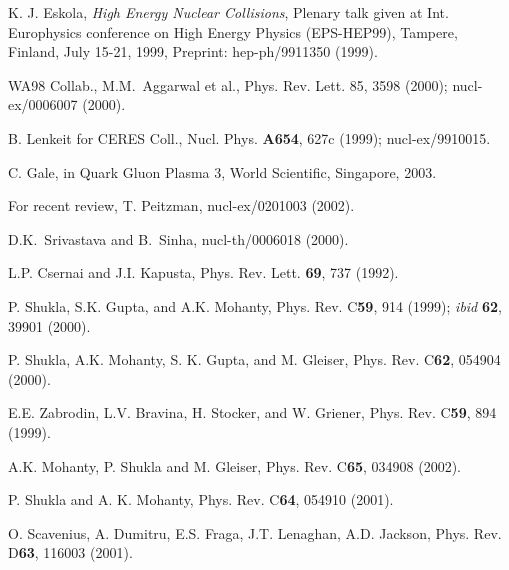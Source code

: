 \newpage

\begin{figure}
\centerline{}
\caption{}
\label{photon}
\end{figure}

\begin{figure}
\centerline{}
\caption{}
\label{photon}
\end{figure}


\begin{thebibliography}{00}

 K. J. Eskola, {\it High Energy Nuclear Collisions}, 
  Plenary talk given at Int. Europhysics conference on High Energy Physics 
  (EPS-HEP99), Tampere, Finland, July 15-21, 1999, 
  Preprint: hep-ph/9911350 (1999).
  
 WA98 Collab., M.M.\ Aggarwal et al., 
            Phys. Rev. Lett. 85, 3598 (2000); nucl-ex/0006007 (2000).

 B. Lenkeit for CERES Coll., 
        Nucl. Phys. {\bf A654}, 627c (1999); nucl-ex/9910015.  
  
 C. Gale, in {Quark Gluon Plasma 3}, World Scientific,
         Singapore, 2003. 
         
 For recent review,  T. Peitzman, nucl-ex/0201003 (2002).

 D.K.\ Srivastava and B.\ Sinha, nucl-th/0006018 (2000).

 L.P. Csernai and J.I. Kapusta, Phys. Rev. Lett. {\bf 69},
               737 (1992).

 P. Shukla, S.K. Gupta, and A.K. Mohanty,
         Phys. Rev. C{\bf 59}, 914 (1999); {\it ibid} {\bf 62}, 39901 (2000).

 P. Shukla, A.K. Mohanty, S. K. Gupta, and M. Gleiser,
              Phys. Rev. C{\bf 62}, 054904 (2000).

 E.E. Zabrodin, L.V. Bravina, H. Stocker, and W. Griener,
         Phys. Rev. C{\bf 59}, 894 (1999).

 A.K. Mohanty, P. Shukla and M. Gleiser,
              Phys. Rev. C{\bf 65}, 034908 (2002).
              
 P. Shukla and A. K. Mohanty, Phys. Rev. C{\bf 64},
        054910 (2001).              

 O. Scavenius, A. Dumitru, E.S. Fraga, J.T. Lenaghan,
         A.D. Jackson, Phys. Rev. D{\bf 63}, 116003 (2001).


\end{thebibliography}
